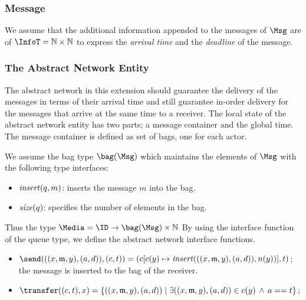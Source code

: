 \subsubsection{Message}
We assume that the additional information appended to the messages of $\Msg$ are of $\InfoT = \mathbb{N}\times \mathbb{N}$ to express the \emph{arrival time} and the \emph{deadline} of the message. %


\subsubsection{The Abstract Network Entity}\label{timed::network}
The abstract network in this extension should guarantee the delivery of the messages in terms of their arrival time and still guarantee in-order delivery for the messages that arrive at the same time to a receiver. %
The local state of the abstract network entity has two parts; a message container and the global time. The message container is defined as set of bags, one for each actor. 

We assume the bag type $\bag(\Msg)$ which maintains the elements of $\Msg$ with the following type interfaces: 
\begin{itemize}
    \item ${\it insert}(q,m)$: inserts the message $m$ into the bag. 
    \item ${\it size}(q)$: specifies the number of elements in the bag.
    
\end{itemize}

Thus the type $\Media=\ID\rightarrow \bag(\Msg)\times \mathbb{N}$ By using the interface function of the queue type, we define the abstract network interface functions.
\begin{itemize}
	\item $\send(((x,\mathfrak{m},y),(a,d)),(c,t))=(c[c(y)\mapsto{\it insert}(((x,\mathfrak{m},y),(a,d)),n(y))],t) $; the message is inserted to the bag of the receiver.
	\item $\transfer((c,t),x)=\{((x,\mathfrak{m},y),(a,d))\mid \exists ((x,\mathfrak{m},y),(a,d))\in c(y)\,\wedge\, a==t\}$;
\end{itemize}  

